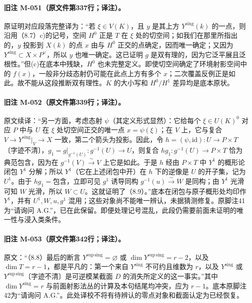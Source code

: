 \paragraph{旧注 M-051（原文件第337行；译注）。}
原证明对应段落完整译为：“若 $\xi\in V(K)$，且 $y$ 是其上方 ${Y^{\mathrm{sing}}}(k)$ 的一点，则沿用（8.7）c)的记号，空间 $H^0$ 正是 $T$ 在 $\xi$ 处的切空间；如我们在那里所指出的，$y$ 投影到 $X(k)$ 的点 $x$ 由与 $H^0$ 正交的点确定，因而唯一确定；又因为 ${Y^{\mathrm{sing}}}\subset X\times P^\vee$，所以 $y$ 也唯一确定。这已证明 $g$ 是双有理的，因为它泛平展且泛根性。”但(c)在底本中残缺，$H^0$ 也未完整定义。即使切空间确定了环境射影空间中的 $f(x)$，一般非分歧态射仍可能在此点上方有多个 $x$；二次覆盖反例正是如此。故不能从这段推断双有理性。$K$ 的大小写和 $H^0/H^1$ 差异均是底本原状。

\paragraph{旧注 M-052（原文件第339行；译注）。}
原文续译：“另一方面，考虑态射 $\psi$（其定义形式显然）：它给每个 $\xi\in U(K)^0$ 对应 $P$ 中与 $U$ 在 $\xi$ 处切空间正交的唯一点 $x=\psi(\xi)$；在 $V$ 上，它与复合 $V\to{Y^{\mathrm{sing}}}|_V\to X$ 一致，第二个箭头为投影。因此，令 $h=(\psi,\mathrm{id}):U\to P\times T$〔字迹不清〕，$g_1=g|_{g^{-1}(U)}:g^{-1}(U)\to U$，则复合 $hg_1:g^{-1}(U)\to P\times T$ 恰为典范包含，因为在 $g^{-1}(V)\xrightarrow{\sim}V$ 上它是如此。于是 $h$ 经由 $P\times T$ 中 $Y^1$ 的概形论闭包 $Y^1$ 分解；所以 $Y^1$（它在上述闭包中开）在 $h$ 下的逆像是 $U$ 的开子集，记为 $U^1$。由于 $hg_1=\text{包含}$，立即可见 $g^1$ 诱导同构 $g^{-1}(u)\xrightarrow{\sim}W$ 是同构；由 $Y^1$ 光滑可知 $W$ 光滑，所以 $W\subset U$。这就证明了（8.9）。”底本在闭包与原子概形处均印作 $Y^1$，并有 $U^1,W,u,g^1$ 混用；这些对象尚不能唯一辨认，未据猜测修复。原脚注41为“请询问 A.G.”，已在此保留。即便处理记号混乱，此段仍需要前面未证明的唯一性与浸入类条件。

\paragraph{旧注 M-053（原文件第342行；译注）。}
原文：“（8.8）最后的断言 ${Y^{\mathrm{sup\,sing}}}=\varnothing$ 或 $\dim{Y^{\mathrm{sup\,sing}}}=r-2$，以及 $\dim T=r-1$，都是平凡的：第一个来自 ${Y^{\mathrm{sing}}}$ 不可约且维数为 $r$，以及 ${Y^{\mathrm{sing}}}$ 或 ${Y^{\mathrm{sup\,sing}}}$〔字迹不清〕是可逆模某截面 $D$ 的消失所定义的这一事实。”其中 $\dim{Y^{\mathrm{sing}}}=r$ 与前面射影法丛的计算及本句结尾均冲突，应为 $r-1$。底本原脚注42为“请询问 A.G.”。此处译校不将有待辨认的零点对象和截面认定为已经恢复。

